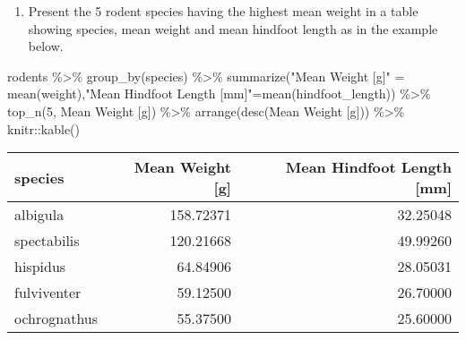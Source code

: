 \documentclass[
]{article}
\newenvironment{Shaded}{\begin{snugshade}}{\end{snugshade}}
\newcommand{\AttributeTok}[1]{\textcolor[rgb]{0.77,0.63,0.00}{#1}}
\newcommand{\DecValTok}[1]{\textcolor[rgb]{0.00,0.00,0.81}{#1}}
\newcommand{\FunctionTok}[1]{\textcolor[rgb]{0.00,0.00,0.00}{#1}}
\newcommand{\NormalTok}[1]{#1}
\newcommand{\OtherTok}[1]{\textcolor[rgb]{0.56,0.35,0.01}{#1}}
\newcommand{\SpecialCharTok}[1]{\textcolor[rgb]{0.00,0.00,0.00}{#1}}
\newcommand{\StringTok}[1]{\textcolor[rgb]{0.31,0.60,0.02}{#1}}
\providecommand{\tightlist}{%
  \setlength{\itemsep}{0pt}\setlength{\parskip}{0pt}}
\begin{document}
\begin{enumerate}
\def\labelenumi{\alph{enumi})}
\setcounter{enumi}{1}
\tightlist
\item
  Present the 5 rodent species having the highest mean weight in a table
  showing species, mean weight and mean hindfoot length as in the
  example below.
\end{enumerate}

\begin{Shaded}
\end{Shaded}

\begin{Shaded}
\begin{Highlighting}[]
\NormalTok{rodents }\SpecialCharTok{\%\textgreater{}\%} 
  \FunctionTok{group\_by}\NormalTok{(species) }\SpecialCharTok{\%\textgreater{}\%} 
  \FunctionTok{summarize}\NormalTok{(}\StringTok{"Mean Weight [g]"} \OtherTok{=} \FunctionTok{mean}\NormalTok{(weight),}\StringTok{"Mean Hindfoot Length [mm]"}\OtherTok{=}\FunctionTok{mean}\NormalTok{(hindfoot\_length)) }\SpecialCharTok{\%\textgreater{}\%} 
  \FunctionTok{top\_n}\NormalTok{(}\DecValTok{5}\NormalTok{, }\StringTok{\textasciigrave{}}\AttributeTok{Mean Weight [g]}\StringTok{\textasciigrave{}}\NormalTok{) }\SpecialCharTok{\%\textgreater{}\%}
  \FunctionTok{arrange}\NormalTok{(}\FunctionTok{desc}\NormalTok{(}\StringTok{\textasciigrave{}}\AttributeTok{Mean Weight [g]}\StringTok{\textasciigrave{}}\NormalTok{)) }\SpecialCharTok{\%\textgreater{}\%}
\NormalTok{  knitr}\SpecialCharTok{::}\FunctionTok{kable}\NormalTok{()}
\end{Highlighting}
\end{Shaded}

\begin{longtable}[]{@{}lrr@{}}
\toprule
species & Mean Weight {[}g{]} & Mean Hindfoot Length {[}mm{]} \\
\midrule
\endhead
albigula & 158.72371 & 32.25048 \\
spectabilis & 120.21668 & 49.99260 \\
hispidus & 64.84906 & 28.05031 \\
fulviventer & 59.12500 & 26.70000 \\
ochrognathus & 55.37500 & 25.60000 \\
\bottomrule
\end{longtable}
\end{document}
